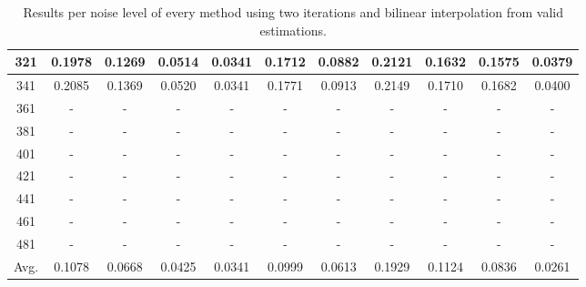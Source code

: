 \begin{table}[ht!]
\begin{tabular}{c|c|c|c|c|c|c|c|c|c|c}
321 & 0.1978 & 0.1269 & 0.0514 & 0.0341 & 0.1712 & 0.0882 & 0.2121 & 0.1632 & 0.1575 & 0.0379 \\ \hline
341 & 0.2085 & 0.1369 & 0.0520 & 0.0341 & 0.1771 & 0.0913 & 0.2149 & 0.1710 & 0.1682 & 0.0400 \\ \hline
361 & - & - & - & - & - & - & - & - & - & - \\ \hline
381 & - & - & - & - & - & - & - & - & - & - \\ \hline
401 & - & - & - & - & - & - & - & - & - & - \\ \hline
421 & - & - & - & - & - & - & - & - & - & - \\ \hline
441 & - & - & - & - & - & - & - & - & - & - \\ \hline
461 & - & - & - & - & - & - & - & - & - & - \\ \hline
481 & - & - & - & - & - & - & - & - & - & - \\ \hline
Avg.  & 0.1078 & 0.0668 & 0.0425 & 0.0341 & 0.0999 & 0.0613 & 0.1929 & 0.1124 & 0.0836 & 0.0261 \\ \hline
\end{tabular}
\caption{Results per noise level of every method using two iterations and bilinear interpolation from valid estimations.}
\label{tab:2itLperNoiseValid}
\end{table}



